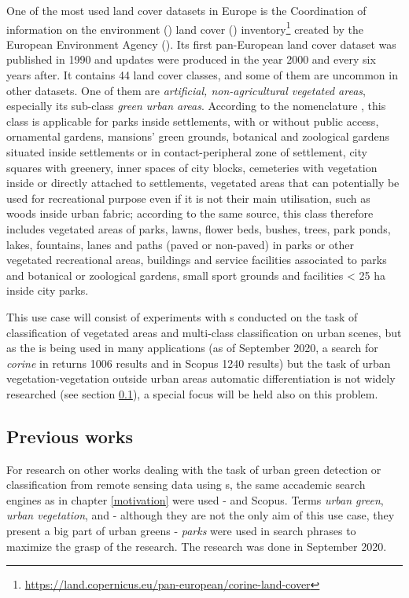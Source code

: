 One of the most used land cover datasets in Europe is the Coordination of information on the environment () land cover () inventory\footnote{\url{https://land.copernicus.eu/pan-european/corine-land-cover}} created by the European Environment Agency (). Its first pan-European land cover dataset was published in 1990 and updates were produced in the year 2000 and every six years after. It contains 44 land cover classes, and some of them are uncommon in other datasets. One of them are \textit{artificial, non-agricultural vegetated areas}, especially its sub-class \textit{green urban areas}. According to the  nomenclature \cite{clc-nomenclature}, this class is applicable for parks inside settlements, with or without public access, ornamental gardens, mansions’ green grounds, botanical and zoological gardens situated inside settlements or in contact-peripheral zone of settlement, city squares with greenery, inner spaces of city blocks, cemeteries with vegetation inside or directly attached to settlements, vegetated areas that can potentially be used for recreational purpose even if it is not their main utilisation, such as woods inside urban fabric; according to the same source, this class therefore includes vegetated areas of parks, lawns, flower beds, bushes, trees, park ponds, lakes, fountains, lanes and paths (paved or non-paved) in parks or other vegetated recreational areas, buildings and service facilities associated to parks and botanical or zoological gardens, small sport grounds and facilities < 25 ha inside city parks.

This use case will consist of experiments with s conducted on the task of classification of vegetated areas and multi-class classification on urban scenes, but as the  is being used in many applications (as of September 2020, a search for \textit{corine} in  returns 1006 results and in Scopus 1240 results) but the task of urban vegetation-vegetation outside urban areas automatic differentiation is not widely researched (see section \ref{urban-green-situation}), a special focus will be held also on this problem.

\subsection{Previous works}
\label{urban-green-situation}

For research on other works dealing with the task of urban green detection or classification from remote sensing data using s, the same accademic search engines as in chapter \ref{motivation} were used -  and Scopus. Terms \textit{urban green}, \textit{urban vegetation}, and - although they are not the only aim of this use case, they present a big part of urban greens - \textit{parks} were used in search phrases to maximize the grasp of the research. The research was done in September 2020.

